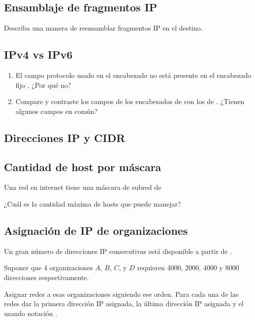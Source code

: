 \documentclass[12pt]{report}
\begin{document}
\begin{exer}
\subsection{Ensamblaje de fragmentos IP \sthree \steo}
Describa una manera de reensamblar fragmentos IP en el destino.
\end{exer}

\begin{exer}
\subsection{IPv4 vs IPv6 \stwo \steo}
\begin{enumerate}
\item El campo protocolo usado en el encabezado  no está presente en el encabezado fijo . ¿Por qué no?
\item Compare y contraste los campos de los encabezados de  con los de . ¿Tienen
algunos campos en común?
\end{enumerate}

\end{exer}

\begin{exer}
\section{Direcciones IP y CIDR}
\subsection{Cantidad de host por máscara \sthree}
Una red en internet tiene una máscara de subred de 

¿Cuál es la cantidad máxima de hosts que puede manejar?
\end{exer}

\begin{exer}
\subsection{Asignación de IP de organizaciones \sfour \shard}
Un gran número de direcciones IP consecutivas está disponible a partir de
.

Suponer que 4 organizaciones $A$, $B$, $C$, y $D$ requieren 4000, 2000, 4000 y 8000
direcciones respectivamente.

Asignar redes a esas organizaciones siguiendo ese orden.
Para cada una de las redes dar la primera dirección IP asignada, la última dirección IP asignada y el  usando notación .
\end{exer}
\end{document}
